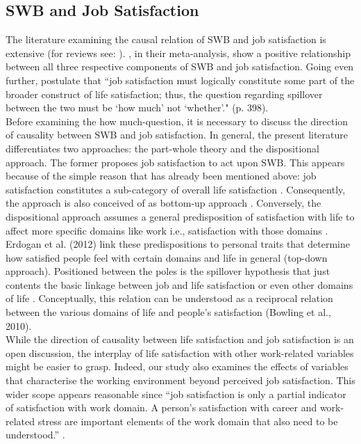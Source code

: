\documentclass[preprint,12pt,authoryear]{elsarticle}
\begin{document}
	\subsection{SWB and Job Satisfaction}
	The literature examining the causal relation of SWB and job satisfaction is extensive
	(for reviews see: \citet{bowling_meta-analytic_2010,erdogan_whistle_2012}). \citet{bowling_meta-analytic_2010}, in their
	meta-analysis, show a positive relationship between all three respective components of SWB and job satisfaction.
	Going even further, \citet{near_job_1987} postulate that “job satisfaction must logically constitute some part of the
	broader construct of life satisfaction; thus, the question regarding spillover between the two must be ‘how much’ not
	‘whether’." (p. 398). \\
	Before examining the how much-question, it is necessary to discuss the direction of causality between SWB and job
	satisfaction. In general, the present literature differentiates two approaches: the part-whole theory
	\citep{bowling_meta-analytic_2010,hart_predicting_1999,judge_dispositional_1998} and the dispositional approach. The former
	proposes job satisfaction to act upon SWB. This appears because of the simple reason that has already been mentioned
	above: job satisfaction constitutes a sub-category of overall life satisfaction \citep[cf.]{near_job_1987}.
	Consequently, the approach is also conceived of as bottom-up approach \citep{erdogan_whistle_2012}. Conversely, the
	dispositional approach assumes a general predisposition of satisfaction with life to affect more specific domains like work
	i.e., satisfaction with those domains \citep{bowling_meta-analytic_2010,diener_subjective_1984,headey_top-down_1991,judge_job_1993,judge_another_1993}. 
	Erdogan et al. (2012) link these predispositions to personal traits that determine how satisfied people feel with certain
	domains and life in general (top-down approach). Positioned between the poles is the spillover hypothesis that just
	contents the basic linkage between job and life satisfaction or even other domains of life 
	\citep{bowling_meta-analytic_2010,erdogan_whistle_2012,judge_job_2001,judge_individual_1994}.
	Conceptually, this relation can be understood as a reciprocal relation between the various domains of life and people’s
	satisfaction (Bowling et al., 2010). \\
	While the direction of causality between life satisfaction and job satisfaction is an open discussion, the interplay of life
	satisfaction with other work-related variables might be easier to grasp. Indeed, our study also examines the effects of
	variables that characterise the working environment beyond perceived job satisfaction. This wider scope appears
	reasonable since “job satisfaction is only a partial indicator of satisfaction with work domain. A person’s satisfaction with
	career and work-related stress are important elements of the work domain that also need to be understood.” \citep[p. 1042]{erdogan_whistle_2012}.
	
\end{document}
